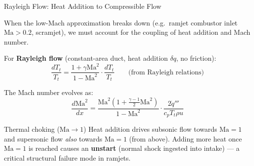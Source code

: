 \documentclass[12pt,aspectratio=169]{beamer}
\newcommand{\Ma}{\mathrm{Ma}}
\begin{document}
\begin{frame}{Rayleigh Flow: Heat Addition to Compressible Flow}

  When the low-Mach approximation breaks down (e.g.\ ramjet
  combustor inlet $\Ma > 0.2$, scramjet), we must account for
  the coupling of heat addition and Mach number.

  \medskip
  For \textbf{Rayleigh flow} (constant-area duct, heat addition $\delta q$,
  no friction):
  \[
    \frac{dT_t}{T_t} = \frac{1 + \gamma\Ma^2}{1-\Ma^2}
    \cdot \frac{dT_t}{T_t}
    \qquad\text{(from Rayleigh relations)}
  \]

  The Mach number evolves as:
  \[
    \frac{d\Ma^2}{dx}
    = \frac{\Ma^2(1+\frac{\gamma-1}{2}\Ma^2)}{1-\Ma^2}
      \cdot \frac{2\dot{q}'''}{c_p T_t \rho u}
  \]

  \begin{alertblock}{Thermal choking ($\Ma \to 1$)}
    Heat addition drives subsonic flow towards $\Ma = 1$ and
    supersonic flow \emph{also} towards $\Ma = 1$ (from above).
    Adding more heat once $\Ma = 1$ is reached causes an
    \textbf{unstart} (normal shock ingested into intake) ---
    a critical structural failure mode in ramjets.
  \end{alertblock}
\end{frame}
\end{document}

